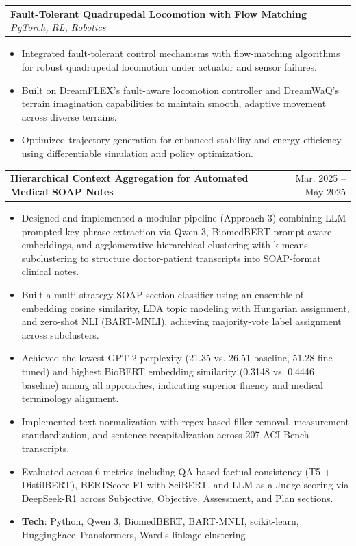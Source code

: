 \documentclass[letterpaper,11pt]{article}
\makeatletter
\newcommand{\resumeItem}[1]{
  \item\small{
    {#1 \vspace{-2pt}}
  }
}
\newcommand{\resumeProjectHeading}[2]{
    \item
    \begin{tabular*}{0.97\textwidth}{l@{\extracolsep{\fill}}r}
      \small#1 & #2 \\
    \end{tabular*}\vspace{-7pt}
}
\newcommand{\resumeItemListStart}{\begin{itemize}[noitemsep, topsep=0pt, parsep=0pt]}
\newcommand{\resumeItemListEnd}{\end{itemize}\vspace{-5pt}}
\makeatother
\begin{document}
  \resumeProjectHeading
    {\textbf{Fault-Tolerant Quadrupedal Locomotion with Flow Matching} $|$ \emph{PyTorch, RL, Robotics}}{}
    \resumeItemListStart
      \resumeItem{Integrated fault-tolerant control mechanisms with flow-matching algorithms for robust quadrupedal locomotion under actuator and sensor failures.}
      \resumeItem{Built on DreamFLEX's fault-aware locomotion controller and DreamWaQ's terrain imagination capabilities to maintain smooth, adaptive movement across diverse terrains.}
      \resumeItem{Optimized trajectory generation for enhanced stability and energy efficiency using differentiable simulation and policy optimization.}
    \resumeItemListEnd


  \resumeProjectHeading
    {\textbf{Hierarchical Context Aggregation for Automated Medical SOAP Notes}}{Mar. 2025 -- May 2025}
    \resumeItemListStart
      \resumeItem{Designed and implemented a modular pipeline (Approach 3) combining LLM-prompted key phrase extraction via Qwen 3, BiomedBERT prompt-aware embeddings, and agglomerative hierarchical clustering with k-means subclustering to structure doctor-patient transcripts into SOAP-format clinical notes.}
      \resumeItem{Built a multi-strategy SOAP section classifier using an ensemble of embedding cosine similarity, LDA topic modeling with Hungarian assignment, and zero-shot NLI (BART-MNLI), achieving majority-vote label assignment across subclusters.}
      \resumeItem{Achieved the lowest GPT-2 perplexity (21.35 vs. 26.51 baseline, 51.28 fine-tuned) and highest BioBERT embedding similarity (0.3148 vs. 0.4446 baseline) among all approaches, indicating superior fluency and medical terminology alignment.}
      \resumeItem{Implemented text normalization with regex-based filler removal, measurement standardization, and sentence recapitalization across 207 ACI-Bench transcripts.}
      \resumeItem{Evaluated across 6 metrics including QA-based factual consistency (T5 + DistilBERT), BERTScore F1 with SciBERT, and LLM-as-a-Judge scoring via DeepSeek-R1 across Subjective, Objective, Assessment, and Plan sections.}
      \resumeItem{\textbf{Tech}{: Python, Qwen 3, BiomedBERT, BART-MNLI, scikit-learn, HuggingFace Transformers, Ward's linkage clustering}}
    \resumeItemListEnd
\end{document}
